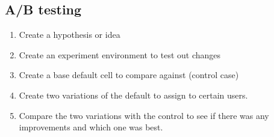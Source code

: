 \subsection{A/B testing}\label{sub:a_b_testing}

\begin{enumerate}
    \item Create a hypothesis or idea
    \item Create an experiment environment to test out changes
    \item Create a base default cell to compare against (control case)
    \item Create two variations of the default to assign to certain users.
    \item Compare the two variations with the control to see if there was any improvements and which one was best.
\end{enumerate}
